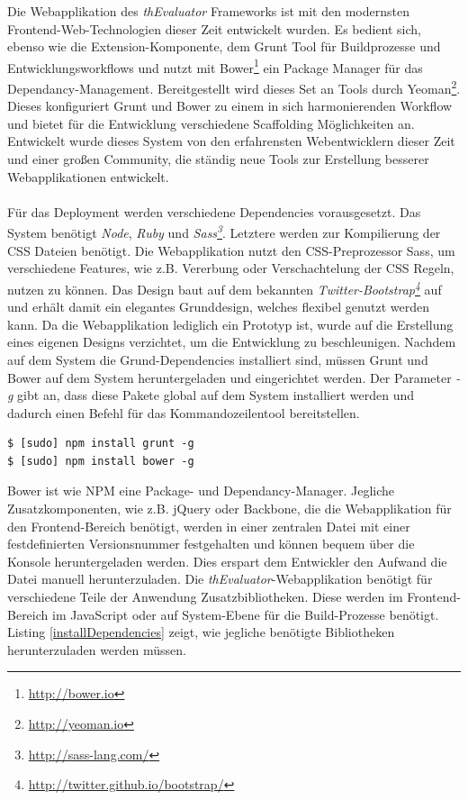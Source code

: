 Die Webapplikation des \textit{thEvaluator} Frameworks ist mit den modernsten Frontend-Web-Technologien dieser Zeit entwickelt wurden. Es bedient sich, ebenso wie die Extension-Komponente, dem Grunt Tool für Buildprozesse und Entwicklungsworkflows und nutzt mit Bower\footnote{\url{http://bower.io}} ein Package Manager für das Dependancy-Management. Bereitgestellt wird dieses Set an Tools durch Yeoman\footnote{\url{http://yeoman.io}}. Dieses konfiguriert Grunt und Bower zu einem in sich harmonierenden Workflow und bietet für die Entwicklung verschiedene Scaffolding Möglichkeiten an. Entwickelt wurde dieses System von den erfahrensten Webentwicklern dieser Zeit und einer großen Community, die ständig neue Tools zur Erstellung besserer Webapplikationen entwickelt.\\
\\
Für das Deployment werden verschiedene Dependencies vorausgesetzt. Das System benötigt \textit{Node}, \textit{Ruby} und \textit{Sass\footnote{\url{http://sass-lang.com/}}}. Letztere werden zur Kompilierung der CSS Dateien benötigt. Die Webapplikation nutzt den CSS-Preprozessor Sass, um verschiedene Features, wie z.B. Vererbung oder Verschachtelung der CSS Regeln, nutzen zu können. Das Design baut auf dem bekannten \textit{Twitter-Bootstrap\footnote{\url{http://twitter.github.io/bootstrap/}}} auf und erhält damit ein elegantes Grunddesign, welches flexibel genutzt werden kann. Da die Webapplikation lediglich ein Prototyp ist, wurde auf die Erstellung eines eigenen Designs verzichtet, um die Entwicklung zu beschleunigen. Nachdem auf dem System die Grund-Dependencies installiert sind, müssen Grunt und Bower auf dem System heruntergeladen und eingerichtet werden. Der Parameter \textit{-g} gibt an, dass diese Pakete global auf dem System installiert werden und dadurch einen Befehl für das Kommandozeilentool bereitstellen.

\vspace{1cm}
\begin{lstlisting}[caption=Installation von Grunt und Bower auf dem System,label=installPackages]
$ [sudo] npm install grunt -g
$ [sudo] npm install bower -g
\end{lstlisting}
\vspace{0.5cm}

Bower ist wie NPM eine Package- und Dependancy-Manager. Jegliche Zusatzkomponenten, wie z.B. jQuery oder Backbone, die die Webapplikation für den Frontend-Bereich benötigt, werden in einer zentralen Datei mit einer festdefinierten Versionsnummer festgehalten und können bequem über die Konsole heruntergeladen werden. Dies erspart dem Entwickler den Aufwand die Datei manuell herunterzuladen. Die \textit{thEvaluator}-Webapplikation benötigt für verschiedene Teile der Anwendung Zusatzbibliotheken. Diese werden im Frontend-Bereich im JavaScript oder auf System-Ebene für die Build-Prozesse benötigt. Listing \ref{installDependencies} zeigt, wie jegliche benötigte Bibliotheken herunterzuladen werden müssen.

